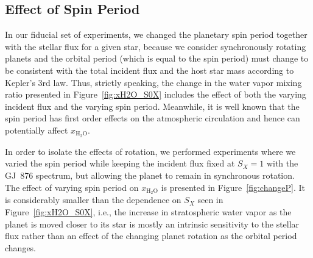 \documentclass[11pt,numberedappendix,twocolappendix,]{emulateapj}
\def\water{H$_2$O}
\def\xwater{$x_\text{\water}$}
\def\wv{water vapor}
\begin{document}
\subsection{Effect of Spin Period}
\label{ss:sensitivity_Porbit}

In our fiducial set of experiments, we changed the planetary spin period together with the stellar flux for a given star, because we consider synchronously rotating planets and the orbital period (which is equal to the spin period) must change to be consistent with the total incident flux and the host star mass according to Kepler's 3rd law. 
Thus, strictly speaking, the change in the \wv{} mixing ratio presented in Figure~\ref{fig:xH2O_S0X} includes the effect of both the varying incident flux and the varying spin period. 
Meanwhile, it is well known that the spin period has first order effects on the atmospheric circulation and hence can potentially affect \xwater{}. 

In order to isolate the effects of rotation, we performed experiments where we varied the spin period while keeping the incident flux fixed at $S_X=1$ with the GJ~876 spectrum, but allowing the planet to remain in synchronous rotation. 
The effect of varying spin period on \xwater{} is presented in Figure~\ref{fig:changeP}. 
It is considerably smaller than the dependence on $S_X$ seen in Figure~\ref{fig:xH2O_S0X}, i.e., the increase in stratospheric water vapor as the planet is moved closer to its star is mostly an intrinsic sensitivity to the stellar flux rather than an effect of the changing planet rotation as the orbital period changes. 
\end{document}
